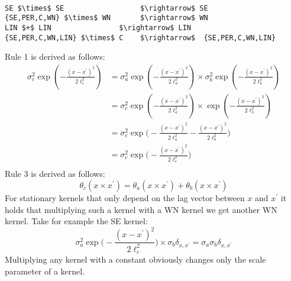 \begin{minipage}{\linewidth}
\small
\belowcaptionskip=-10pt
\begin{lstlisting}[frame=single,mathescape,label=alg:simplify,basicstyle=\selectfont\ttfamily]

SE $\times$ SE                  $\rightarrow$ SE 
{SE,PER,C,WN} $\times$ WN       $\rightarrow$ WN
LIN $+$ LIN                $\rightarrow$ LIN
{SE,PER,C,WN,LIN} $\times$ C    $\rightarrow$  {SE,PER,C,WN,LIN} 
\end{lstlisting}
\end{minipage}
Rule 1 is derived as follows:
\begin{equation}
\begin{aligned}
\sigma_c^2 \exp(-\frac{(x-x^\prime)^2}{2\ell_c^2})  &=  \sigma_a^2 \exp(-\frac{(x-x^\prime)^2}{2\ell_a^2}) \times  \sigma_b^2 \exp(-\frac{(x-x^\prime)^2}{2\ell_b^2}) \\
&= \sigma_c^2 \exp(-\frac{(x-x^\prime)^2}{2\ell_a^2}) \times   \exp(-\frac{(x-x^\prime)^2}{2\ell_b^2}) \\
&= \sigma_c^2 \exp \bigg(-\frac{(x-x^\prime)^2}{2\ell_a^2} -\frac{(x-x^\prime)^2}{2\ell_b^2}\bigg) \\
&= \sigma_c^2 \exp \bigg(-\frac{(x-x^\prime)^2}{2\ell_c^2}\bigg) \\
\end{aligned}
\end{equation}
Rule 3 is derived as follows:
\begin{equation}
 \theta_c (x \times x^\prime) = \theta_a (x \times x^\prime) + \theta_b (x \times x^\prime) 
\end{equation}
For stationary kernels that only depend on the lag vector between $x$ and $x^\prime$ it holds that multiplying such a kernel with a WN kernel we get another WN kernel. Take for example the SE kernel:
\begin{equation}
 \sigma_a^2 \exp \bigg(-\frac{(x-x^\prime)^2}{2\ell_c^2}\bigg) \times  \sigma_b \delta_{x,x^\prime} =  \sigma_a \sigma_b \delta_{x,x^\prime}
\end{equation}
Multiplying any kernel with a constant obviously changes only the scale parameter of a kernel.

